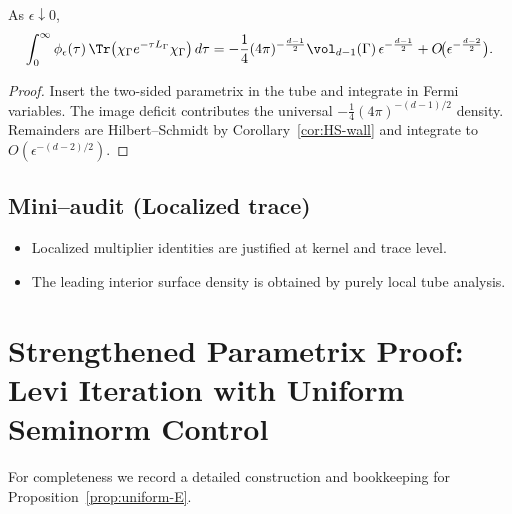 \begin{proposition}
\label{prop:abelian-collar-strong}
As $\epsilon\downarrow0$,
\[
\int_0^\infty \phi_\epsilon(\tau)\,\Tr\big(\chi_\Gamma e^{-\tau L_\Gamma}\chi_\Gamma\big)\,d\tau
= -\frac14(4\pi)^{-\frac{d-1}{2}}\vol_{d-1}(\Gamma)\,\epsilon^{-\frac{d-1}{2}}
+O\!\big(\epsilon^{-\frac{d-2}{2}}\big).
\]
\end{proposition}

\begin{proof}
Insert the two-sided parametrix in the tube and integrate in Fermi variables. The image deficit contributes the universal $-\frac14(4\pi)^{-(d-1)/2}$ density. Remainders are Hilbert–Schmidt by Corollary~\ref{cor:HS-wall} and integrate to $O(\epsilon^{-(d-2)/2})$.
\end{proof}

\subsection*{Mini–audit (Localized trace)}
\begin{itemize}
  \item Localized multiplier identities are justified at kernel and trace level.
  \item The leading interior surface density is obtained by purely local tube analysis.
\end{itemize}

\section{Strengthened Parametrix Proof: Levi Iteration with Uniform Seminorm Control}
\label{sec:levi-proof}

For completeness we record a detailed construction and bookkeeping for Proposition~\ref{prop:uniform-E}.

